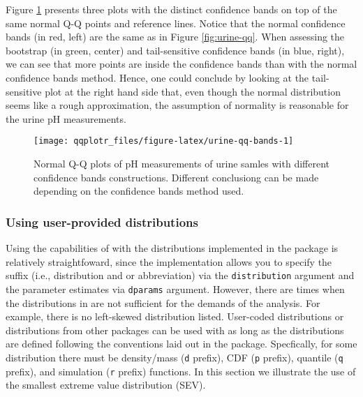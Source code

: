 Figure \ref{fig:urine-qq-bands} presents three plots with the distinct
confidence bands on top of the same normal Q-Q points and reference
lines. Notice that the normal confidence bands (in red, left) are the
same as in Figure \ref{fig:urine-qq}. When assessing the bootstrap (in
green, center) and tail-sensitive confidence bands (in blue, right), we
can see that more points are inside the confidence bands than with the
normal confidence bands method. Hence, one could conclude by looking at
the tail-sensitive plot at the right hand side that, even though the
normal distribution seems like a rough approximation, the assumption of
normality is reasonable for the urine pH measurements.

\begin{Schunk}
\begin{figure}

{\centering \texttt{[image: qqplotr\_files/figure-latex/urine-qq-bands-1]} 

}

\caption[Normal Q-Q plots of pH measurements of urine samles with different confidence bands constructions]{Normal Q-Q plots of pH measurements of urine samles with different confidence bands constructions. Different conclusiong can be made depending on the confidence bands method used.}\label{fig:urine-qq-bands}
\end{figure}
\end{Schunk}

\FloatBarrier

\subsubsection{Using user-provided
distributions}\label{using-user-provided-distributions}

\label{sec:user-dists}

Using the capabilities of  with the distributions
implemented in the  package is relatively straightfoward,
since the implementation allows you to specify the suffix (i.e.,
distribution and or abbreviation) via the \texttt{distribution} argument
and the parameter estimates via \texttt{dparams} argument. However,
there are times when the distributions in  are not sufficient
for the demands of the analysis. For example, there is no left-skewed
distribution listed. User-coded distributions or distributions from
other packages can be used with  as long as the
distributions are defined following the conventions laid out in the
 package. Specfically, for some distribution there must be
density/mass (\texttt{d} prefix), CDF (\texttt{p} prefix), quantile
(\texttt{q} prefix), and simulation (\texttt{r} prefix) functions. In
this section we illustrate the use of the smallest extreme value
distribution (SEV).

